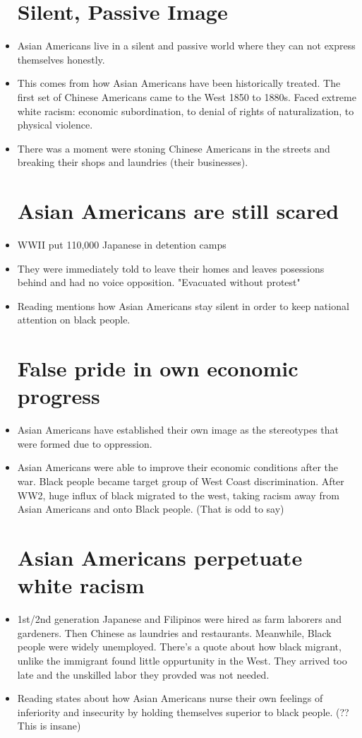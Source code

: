 \documentclass{article}
\begin{document}
\begin{itemize}
  \section*{Silent, Passive Image}
  \item Asian Americans live in a silent and passive world
    where they can not express themselves honestly.
  \item This comes from how Asian Americans have been historically treated.
    The first set of Chinese Americans came to the West 1850 to 1880s. 
    Faced extreme white racism: economic subordination, 
    to denial of rights of naturalization, to physical violence.
  \item There was a moment were stoning Chinese Americans in the streets
    and breaking their shops and laundries (their businesses).

  \section*{Asian Americans are still scared}
  \item WWII put 110,000 Japanese in detention camps
  \item They were immediately told to leave their homes and
    leaves posessions behind and had no voice opposition.
    "Evacuated without protest"
  \item Reading mentions how Asian Americans stay silent 
    in order to keep national attention on black people.

  \section*{False pride in own economic progress}
  \item Asian Americans have established their own image
    as the stereotypes that were formed due to oppression.
  \item Asian Americans were able to improve their economic conditions
    after the war.
    Black people became target group of West Coast discrimination.
    After WW2, huge influx of black migrated to the west,
    taking racism away from Asian Americans and onto Black people.
    (That is odd to say)
  \section*{Asian Americans perpetuate white racism}
\item 1st/2nd generation Japanese and Filipinos were hired as farm laborers 
  and gardeners. Then Chinese as laundries and restaurants.
  Meanwhile, Black people were widely unemployed. 
  There's a quote about how black migrant, unlike the immigrant
  found little oppurtunity in the West. They arrived too late
  and the unskilled labor they provded was not needed.
\item Reading states about how Asian Americans
  nurse their own feelings of inferiority and insecurity by holding
  themselves superior to black people. (?? This is insane)
\end{itemize}
\end{document}
